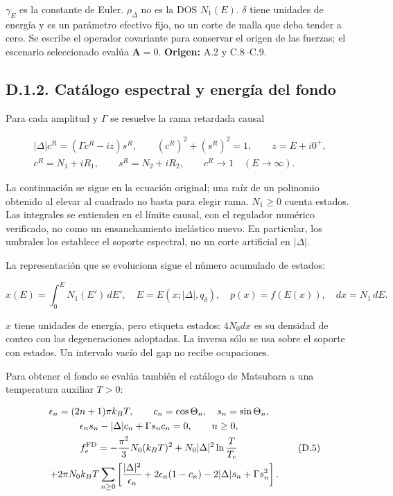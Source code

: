 \documentclass[
  spanish,
  10pt,
  a4paper,
]{article}
\begin{document}
\(\gamma_E\) es la constante de Euler. \(\rho_\Delta\) no es la DOS
\(N_1(E)\). \(\delta\) tiene unidades de energía y es un parámetro
efectivo fijo, no un corte de malla que deba tender a cero. Se escribe
el operador covariante para conservar el origen de las fuerzas; el
escenario seleccionado evalúa \(\mathbf A=0\). \textbf{Origen:} A.2 y
C.8--C.9.

\subsection{D.1.2. Catálogo espectral y energía del
fondo}\label{d.1.2.-catuxe1logo-espectral-y-energuxeda-del-fondo}

Para cada amplitud y \(\Gamma\) se resuelve la rama retardada causal

\[
\begin{gathered}
|\Delta|c^R=(\Gamma c^R-iz)s^R,\qquad (c^R)^2+(s^R)^2=1,
\qquad z=E+i0^+,\\
c^R=N_1+iR_1,\qquad s^R=N_2+iR_2,\qquad c^R\longrightarrow1
\quad(E\longrightarrow\infty).
\end{gathered}\tag{D.3}
\]

La continuación se sigue en la ecuación original; una raíz de un
polinomio obtenido al elevar al cuadrado no basta para elegir rama.
\(N_1\geq0\) cuenta estados. Las integrales se entienden en el límite
causal, con el regulador numérico verificado, no como un ensanchamiento
inelástico nuevo. En particular, los umbrales los establece el soporte
espectral, no un corte artificial en \(|\Delta|\).

La representación que se evoluciona sigue el número acumulado de
estados:

\[
x(E)=\int_0^E N_1(E')\,dE',\quad E=E(x;|\Delta|,q_\delta),
\quad p(x)=f(E(x)),\quad dx=N_1\,dE.
\tag{D.4}
\]

\(x\) tiene unidades de energía, pero etiqueta estados: \(4N_0dx\) es su
densidad de conteo con las degeneraciones adoptadas. La inversa sólo se
usa sobre el soporte con estados. Un intervalo vacío del gap no recibe
ocupaciones.

Para obtener el fondo se evalúa también el catálogo de Matsubara a una
temperatura auxiliar \(T>0\):

\[
\begin{gathered}
\epsilon_n=(2n+1)\pi k_BT,\qquad c_n=\cos\Theta_n,\quad s_n=\sin\Theta_n,\\
\epsilon_n s_n-|\Delta|c_n+\Gamma s_nc_n=0,\qquad n\geq0,\\
f_e^{\rm FD}=-\frac{\pi^2}{3}N_0(k_BT)^2+N_0|\Delta|^2\ln\frac{T}{T_c}\\
\hspace{4mm}+2\pi N_0k_BT\sum_{n\geq0}
\left[\frac{|\Delta|^2}{\epsilon_n}+2\epsilon_n(1-c_n)
-2|\Delta|s_n+\Gamma s_n^2\right].
\end{gathered}\tag{D.5}
\]
\end{document}
